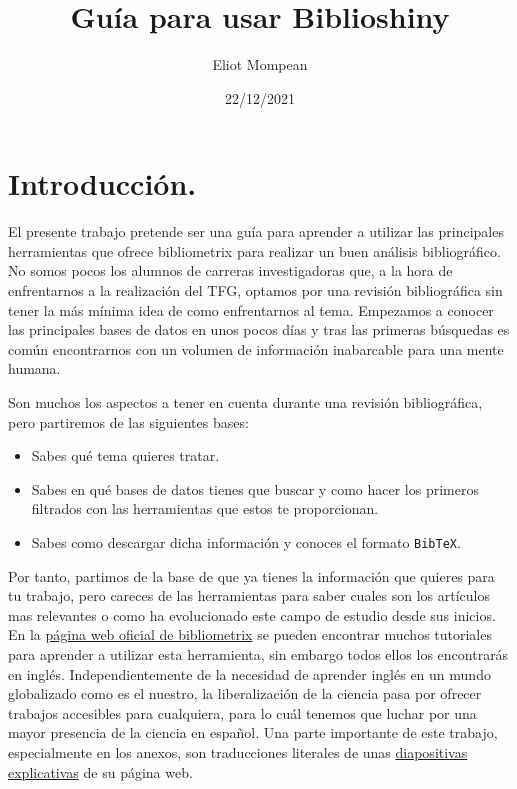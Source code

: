 \documentclass[
]{article}
\title{Guía para usar Biblioshiny}
\author{Eliot Mompean}
\date{22/12/2021}
\providecommand{\tightlist}{%
  \setlength{\itemsep}{0pt}\setlength{\parskip}{0pt}}
\begin{document}
\maketitle

{
\setcounter{tocdepth}{3}
\tableofcontents
}
\hypertarget{introducciuxf3n.}{%
\section{Introducción.}\label{introducciuxf3n.}}

El presente trabajo pretende ser una guía para aprender a utilizar las
principales herramientas que ofrece bibliometrix para realizar un buen
análisis bibliográfico. No somos pocos los alumnos de carreras
investigadoras que, a la hora de enfrentarnos a la realización del TFG,
optamos por una revisión bibliográfica sin tener la más mínima idea de
como enfrentarnos al tema. Empezamos a conocer las principales bases de
datos en unos pocos días y tras las primeras búsquedas es común
encontrarnos con un volumen de información inabarcable para una mente
humana.

Son muchos los aspectos a tener en cuenta durante una revisión
bibliográfica, pero partiremos de las siguientes bases:

\begin{itemize}
\tightlist
\item
  Sabes qué tema quieres tratar.
\item
  Sabes en qué bases de datos tienes que buscar y como hacer los
  primeros filtrados con las herramientas que estos te proporcionan.
\item
  Sabes como descargar dicha información y conoces el formato
  \texttt{BibTeX}.
\end{itemize}

Por tanto, partimos de la base de que ya tienes la información que
quieres para tu trabajo, pero careces de las herramientas para saber
cuales son los artículos mas relevantes o como ha evolucionado este
campo de estudio desde sus inicios. En la
\href{https://www.bibliometrix.org/}{página web oficial de bibliometrix}
se pueden encontrar muchos tutoriales para aprender a utilizar esta
herramienta, sin embargo todos ellos los encontrarás en inglés.
Independientemente de la necesidad de aprender inglés en un mundo
globalizado como es el nuestro, la liberalización de la ciencia pasa por
ofrecer trabajos accesibles para cualquiera, para lo cuál tenemos que
luchar por una mayor presencia de la ciencia en español. Una parte
importante de este trabajo, especialmente en los anexos, son
traducciones literales de unas
\href{https://bibliometrix.org/biblioshiny/assets/player/KeynoteDHTMLPlayer.html\#1}{diapositivas
explicativas} de su página web.
\end{document}
